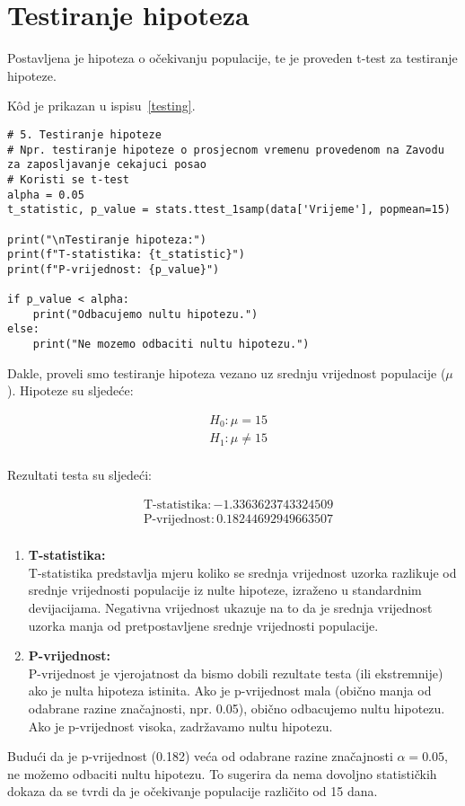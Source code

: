 \section{Testiranje hipoteza}

Postavljena je hipoteza o očekivanju populacije, te je proveden t-test za testiranje hipoteze.

K\^od je prikazan u ispisu~\ref{testing}.

\begin{lstlisting}[caption={Testiranje hipoteza}, label=testing]
# 5. Testiranje hipoteze
# Npr. testiranje hipoteze o prosjecnom vremenu provedenom na Zavodu za zaposljavanje cekajuci posao
# Koristi se t-test
alpha = 0.05
t_statistic, p_value = stats.ttest_1samp(data['Vrijeme'], popmean=15)

print("\nTestiranje hipoteza:")
print(f"T-statistika: {t_statistic}")
print(f"P-vrijednost: {p_value}")

if p_value < alpha:
    print("Odbacujemo nultu hipotezu.")
else:
    print("Ne mozemo odbaciti nultu hipotezu.")
\end{lstlisting}

Dakle, proveli smo testiranje hipoteza vezano uz srednju vrijednost populacije (\( \mu \)). Hipoteze su sljedeće:

\[
\begin{aligned}
& H_0: \mu = 15 \\
& H_1: \mu \neq 15 \\
\end{aligned}
\]

Rezultati testa su sljedeći:

\[
\begin{aligned}
& \text{T-statistika}:-1.3363623743324509 \\
& \text{P-vrijednost}:0.18244692949663507 \\
\end{aligned}
\]

\newpage

\begin{enumerate}
  \item \textbf{T-statistika:}\\
T-statistika predstavlja mjeru koliko se srednja vrijednost uzorka razlikuje od srednje vrijednosti populacije iz nulte hipoteze, izraženo u standardnim devijacijama. Negativna vrijednost ukazuje na to da je srednja vrijednost uzorka manja od pretpostavljene srednje vrijednosti populacije.
  \item \textbf{P-vrijednost:}\\
P-vrijednost je vjerojatnost da bismo dobili rezultate testa (ili ekstremnije) ako je nulta hipoteza istinita. Ako je p-vrijednost mala (obično manja od odabrane razine značajnosti, npr. 0.05), obično odbacujemo nultu hipotezu. Ako je p-vrijednost visoka, zadržavamo nultu hipotezu.
\end{enumerate}

Budući da je p-vrijednost (0.182) veća od odabrane razine značajnosti $\alpha = 0.05$, ne možemo odbaciti nultu hipotezu. To sugerira da nema dovoljno statističkih dokaza da se tvrdi da je očekivanje populacije različito od 15 dana.